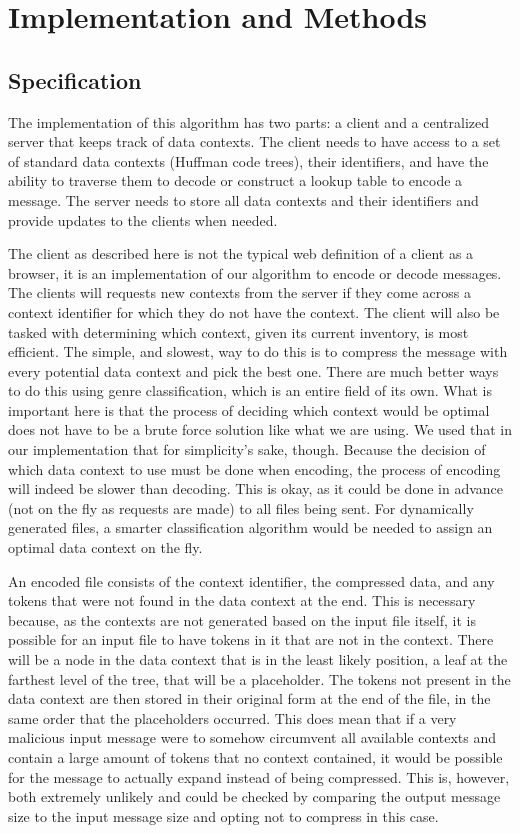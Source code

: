 \section{Implementation and Methods}

\subsection{Specification}

The implementation of this algorithm has two parts: a client and a centralized server that keeps track of data contexts. The client needs to have access to a set of standard data contexts (Huffman code trees), their identifiers, and have the ability to traverse them to decode or construct a lookup table to encode a message. The server needs to store all data contexts and their identifiers and provide updates to the clients when needed.

The client as described here is not the typical web definition of a client as a browser, it is an implementation of our algorithm to encode or decode messages. The clients will requests new contexts from the server if they come across a context identifier for which they do not have the context. The client will also be tasked with determining which context, given its current inventory, is most efficient. The simple, and slowest, way to do this is to compress the message with every potential data context and pick the best one. There are much better ways to do this using genre classification, which is an entire field of its own. What is important here is that the process of deciding which context would be optimal does not have to be a brute force solution like what we are using. We used that in our implementation that for simplicity's sake, though. Because the decision of which data context to use must be done when encoding, the process of encoding will indeed be slower than decoding. This is okay, as it could be done in advance (not on the fly as requests are made) to all files being sent. For dynamically generated files, a smarter classification algorithm would be needed to assign an optimal data context on the fly.

An encoded file consists of the context identifier, the compressed data, and any tokens that were not found in the data context at the end. This is necessary because, as the contexts are not generated based on the input file itself, it is possible for an input file to have tokens in it that are not in the context. There will be a node in the data context that is in the least likely position, a leaf at the farthest level of the tree, that will be a placeholder. The tokens not present in the data context are then stored in their original form at the end of the file, in the same order that the placeholders occurred. This does mean that if a very malicious input message were to somehow circumvent all available contexts and contain a large amount of tokens that no context contained, it would be possible for the message to actually expand instead of being compressed. This is, however, both extremely unlikely and could be checked by comparing the output message size to the input message size and opting not to compress in this case.

